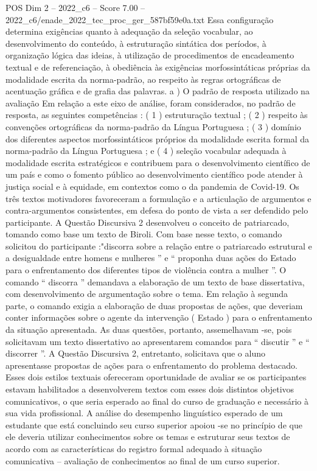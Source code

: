 \begin{textsample}{POS Dim 2 – 2022\_c6 – Score 7.00 – 2022\_c6/enade\_2022\_tec\_proc\_ger\_587bf59e0a.txt}
Essa configuração determina exigências quanto à adequação da seleção vocabular, ao desenvolvimento do conteúdo, à estruturação sintática dos períodos, à organização lógica das ideias, à utilização de procedimentos de encadeamento textual e de referenciação, à obediência às exigências morfossintáticas próprias da modalidade escrita da norma-padrão, ao respeito às regras ortográficas de acentuação gráfica e de grafia das palavras. a ) O padrão de resposta utilizado na avaliação Em relação a este eixo de análise, foram considerados, no padrão de resposta, as seguintes competências : ( 1 ) estruturação textual ; ( 2 ) respeito às convenções ortográficas da norma-padrão da Língua Portuguesa ; ( 3 ) domínio dos diferentes aspectos morfossintáticos próprios da modalidade escrita formal da norma-padrão da Língua Portuguesa ; e ( 4 ) seleção vocabular adequada à modalidade escrita estratégicos e contribuem para o desenvolvimento científico de um país e como o fomento público ao desenvolvimento científico pode atender à justiça social e à equidade, em contextos como o da pandemia de Covid-19.
Os três textos motivadores favoreceram a formulação e a articulação de argumentos e contra-argumentos consistentes, em defesa do ponto de vista a ser defendido pelo participante.
A Questão Discursiva 2 desenvolveu o conceito de patriarcado, tomando como base um texto de Biroli.
Com base nesse texto, o comando solicitou do participante :"discorra sobre a relação entre o patriarcado estrutural e a desigualdade entre homens e mulheres ” e “ proponha duas ações do Estado para o enfrentamento dos diferentes tipos de violência contra a mulher ”.
O comando “ discorra ” demandava a elaboração de um texto de base dissertativa, com desenvolvimento de argumentação sobre o tema.
Em relação à segunda parte, o comando exigia a elaboração de duas propostas de ações, que deveriam conter informações sobre o agente da intervenção ( Estado ) para o enfrentamento da situação apresentada.
As duas questões, portanto, assemelhavam -se, pois solicitavam um texto dissertativo ao apresentarem comandos para “ discutir ” e “ discorrer ”.
A Questão Discursiva 2, entretanto, solicitava que o aluno apresentasse propostas de ações para o enfrentamento do problema destacado.
Esses dois estilos textuais ofereceram oportunidade de avaliar se os participantes estavam habilitados a desenvolverem textos com esses dois distintos objetivos comunicativos, o que seria esperado ao final do curso de graduação e necessário à sua vida profissional.
A análise do desempenho linguístico esperado de um estudante que está concluindo seu curso superior apoiou -se no princípio de que ele deveria utilizar conhecimentos sobre os temas e estruturar seus textos de acordo com as características do registro formal adequado à situação comunicativa – avaliação de conhecimentos ao final de um curso superior.

\end{textsample}
